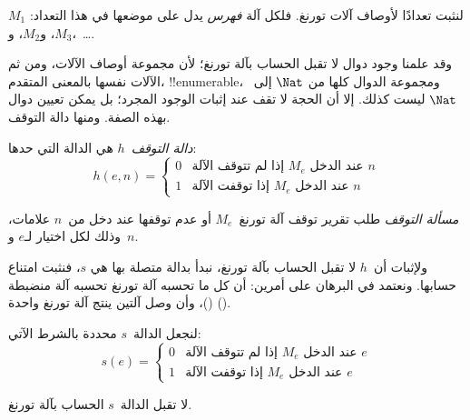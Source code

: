 \documentclass[../../../include/open-logic-section]{subfiles}
\begin{document}

\begin{explain}
لنثبت تعدادًا لأوصاف آلات تورنغ. فلكل آلة \emph{فهرس} يدل على
موضعها في هذا التعداد: $M_1$، و$M_2$، و$M_3$،~\dots.

وقد علمنا وجود دوال لا تقبل الحساب بآلة تورنغ؛ لأن مجموعة أوصاف
الآلات، ومن ثم الآلات نفسها بالمعنى المتقدم، !!{enumerable}،
ومجموعة الدوال كلها من $\Nat$ إلى~$\Nat$ ليست كذلك. إلا أن الحجة
لا تقف عند إثبات الوجود المجرد؛ بل يمكن تعيين دوال بهذه الصفة.
ومنها دالة التوقف.
\end{explain}

\begin{defn}
 \emph{دالة التوقف}~$h$ هي الدالة التي حدها:
\[
h(e,n) =
\begin{cases}
  \text{0} & \text{إذا لم تتوقف الآلة~$M_e$ عند الدخل $n$} \\
  \text{1} & \text{إذا توقفت الآلة~$M_e$ عند الدخل $n$}
\end{cases}
\]
\end{defn}

\begin{defn}
\emph{مسألة التوقف} طلب تقرير توقف آلة تورنغ~$M_e$ أو عدم توقفها
عند دخل من~$n$ علامات، وذلك لكل اختيار لـ$e$ و~$n$.
\end{defn}

\begin{explain}
ولإثبات أن~$h$ لا تقبل الحساب بآلة تورنغ، نبدأ بدالة متصلة بها
هي $s$، فنثبت امتناع حسابها. ونعتمد في البرهان على أمرين: أن كل
ما تحسبه آلة تورنغ تحسبه آلة منضبطة
()، وأن وصل آلتين ينتج آلة تورنغ واحدة
().
\end{explain}

\begin{defn} لنجعل الدالة~$s$ محددة بالشرط الآتي:
\[
s(e) =
\begin{cases}
  \text{0} & \text{إذا لم تتوقف الآلة~$M_e$ عند الدخل $e$} \\
  \text{1} & \text{إذا توقفت الآلة~$M_e$ عند الدخل $e$}
\end{cases}
\]
\end{defn}

\begin{lem}
لا تقبل الدالة~$s$ الحساب بآلة تورنغ.
\end{lem}
\end{document}
